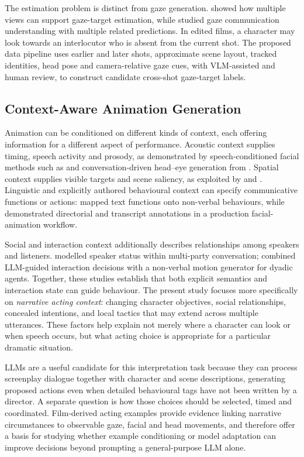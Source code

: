 \documentclass[11pt,a4paper]{article}
\begin{document}
The estimation problem is distinct from gaze generation. \citet{miao2025multiview} showed how multiple views can support gaze-target estimation, while \citet{peng2025gazecommunication} studied gaze communication understanding with multiple related predictions. In edited films, a character may look towards an interlocutor who is absent from the current shot. The proposed data pipeline uses earlier and later shots, approximate scene layout, tracked identities, head pose and camera-relative gaze cues, with VLM-assisted and human review, to construct candidate cross-shot gaze-target labels.

\subsection{Context-Aware Animation Generation}

Animation can be conditioned on different kinds of context, each offering information for a different aspect of performance. Acoustic context supplies timing, speech activity and prosody, as demonstrated by speech-conditioned facial methods such as \citet{edwards2016jali} and conversation-driven head--eye generation from \citet{jin2019threeparty}. Spatial context supplies visible targets and scene saliency, as exploited by \citet{kokkinara2011attention} and \citet{pan2024s3}. Linguistic and explicitly authored behavioural context can specify communicative functions or actions: \citet{cassell2001beat} mapped text functions onto non-verbal behaviours, while \citet{edwards2020cyberpunk} demonstrated directorial and transcript annotations in a production facial-animation workflow.

Social and interaction context additionally describes relationships among speakers and listeners. \citet{jin2019threeparty} modelled speaker status within multi-party conversation; \citet{zhang2025socialagent} combined LLM-guided interaction decisions with a non-verbal motion generator for dyadic agents. Together, these studies establish that both explicit semantics and interaction state can guide behaviour. The present study focuses more specifically on \emph{narrative acting context}: changing character objectives, social relationships, concealed intentions, and local tactics that may extend across multiple utterances. These factors help explain not merely where a character can look or when speech occurs, but what acting choice is appropriate for a particular dramatic situation.

LLMs are a useful candidate for this interpretation task because they can process screenplay dialogue together with character and scene descriptions, generating proposed actions even when detailed behavioural tags have not been written by a director. A separate question is how those choices should be selected, timed and coordinated. Film-derived acting examples provide evidence linking narrative circumstances to observable gaze, facial and head movements, and therefore offer a basis for studying whether example conditioning or model adaptation can improve decisions beyond prompting a general-purpose LLM alone.
\end{document}
